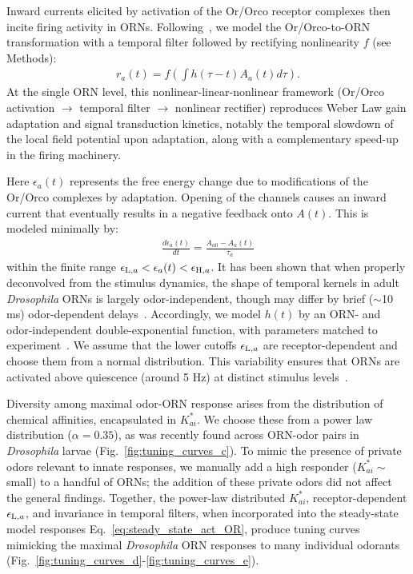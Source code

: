 Inward currents elicited by activation of the Or/Orco receptor complexes then incite firing activity in ORNs. Following~\cite{srinivas_elife}, we model the Or/Orco-to-ORN transformation with a temporal filter followed by rectifying nonlinearity $f$ (see Methods):
\begin{align}
r_a(t) = f\left(\int h(\tau - t)A_a(t) d\tau\right).
\label{eq:steady_state_firing}
\end{align}
At the single ORN level, this nonlinear-linear-nonlinear framework (Or/Orco activation $\rightarrow$ temporal filter $\rightarrow$ nonlinear rectifier) reproduces Weber Law gain adaptation and signal transduction kinetics, notably the temporal slowdown of the local field potential upon adaptation, along with a complementary speed-up in the firing machinery.





Here $\epsilon_a(t)$ represents the free energy change due to modifications of the Or/Orco complexes by adaptation. Opening of the channels causes an inward current that eventually results in a negative feedback onto $A(t)$. This is modeled minimally by:
\begin{align}
\frac{d\epsilon_a(t)}{dt} = \frac{{A}_{a0} - A_a(t)}{\tau_a}
\label{eq:adaptation_dynamics}
\end{align}
within the finite range $\epsilon_{\textup{L}, a} < \epsilon_a(t) < \epsilon_{\textup{H}, a}$. It has been shown that when properly deconvolved from the stimulus dynamics, the shape of temporal kernels in adult \textit{Drosophila} ORNs is largely odor-independent, though may differ by brief ($\sim$10 ms) odor-dependent delays~\cite{martelli}. Accordingly, we model $h(t)$ by an ORN- and odor-independent double-exponential function, with parameters matched to experiment~\cite{martelli}. We assume that the lower cutoffs $\epsilon_{\textup{L}, a}$ are receptor-dependent and choose them from a normal distribution. This variability ensures that ORNs are activated above quiescence (around 5 Hz) at distinct stimulus levels~\cite{srinivas_elife}.  %


Diversity among maximal odor-ORN response arises from the distribution of chemical affinities, encapsulated in $K^*_{ai}$. We choose these from a power law distribution ($\alpha = 0.35$), as was recently found across ORN-odor pairs in \textit{Drosophila} larvae (Fig.~\ref{fig:tuning_curves_c}). To mimic the presence of private odors relevant to innate responses, we manually add a high responder ($K^*_{ai} \sim $ small)  to a handful of ORNs; the addition of these private odors did not affect the general findings. Together, the power-law distributed $K^*_{ai}$, receptor-dependent $\epsilon_{\textup{L}, a}$, and invariance in temporal filters, when incorporated into the steady-state model responses Eq.~\ref{eq:steady_state_act_OR}, produce tuning curves mimicking the maximal \textit{Drosophila} ORN responses to many individual odorants~\cite{hallem_carlson} (Fig.~\ref{fig:tuning_curves_d}-\ref{fig:tuning_curves_e}). 



